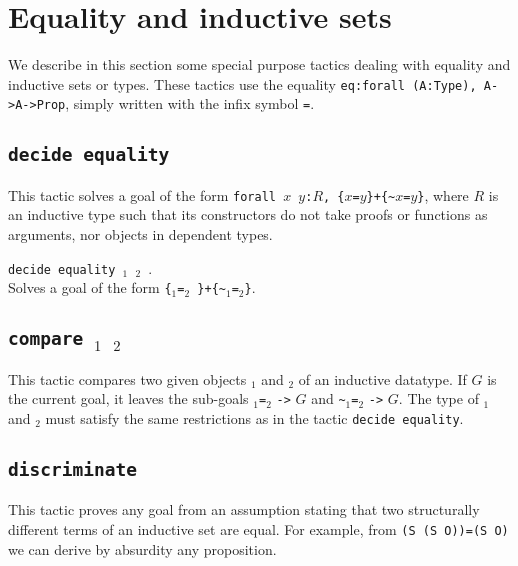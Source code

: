 \section{Equality and inductive sets}

We describe in this section some special purpose tactics dealing with
equality and inductive sets or types. These tactics use the equality
{\tt eq:forall (A:Type), A->A->Prop}, simply written with the
infix symbol {\tt =}.

\subsection{\tt decide equality
\label{decideequality}
}

This tactic solves a goal of the form
{\tt forall $x$ $y$:$R$, \{$x$=$y$\}+\{\verb|~|$x$=$y$\}}, where $R$
is an inductive type such that its constructors do not take proofs or
functions as arguments, nor objects in dependent types.

\begin{Variants}
\item {\tt decide equality {\term}$_1$ {\term}$_2$ }.\\
 Solves a goal of the form {\tt \{}\term$_1${\tt =}\term$_2${\tt
\}+\{\verb|~|}\term$_1${\tt =}\term$_2${\tt \}}.
\end{Variants}

\subsection{\tt compare \term$_1$ \term$_2$
}

This tactic compares two given objects \term$_1$ and \term$_2$ 
of an inductive datatype. If $G$ is the current goal, it leaves the sub-goals
\term$_1${\tt =}\term$_2$ {\tt ->} $G$ and \verb|~|\term$_1${\tt =}\term$_2$
{\tt ->} $G$. The type
of \term$_1$ and \term$_2$ must satisfy the same restrictions as in the tactic
\texttt{decide equality}.

\subsection{\tt discriminate {\term}
\label{discriminate}
}

This tactic proves any goal from an assumption stating that two
structurally different terms of an inductive set are equal. For
example, from {\tt (S (S O))=(S O)} we can derive by absurdity any
proposition.

